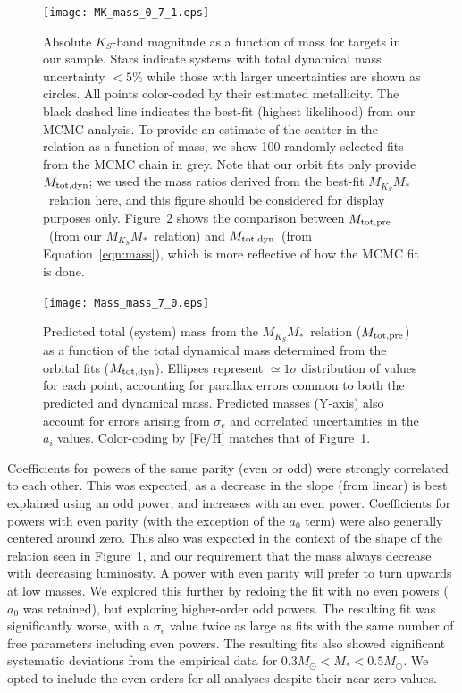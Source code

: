 \documentclass[twocolumn]{aastex62}
\newcommand{\mmk}{$M_{K_S}$\textendash$M_*$}
\newcommand{\mpred}{$M_{\rm{tot,pre}}$}
\newcommand{\mdyn}{$M_{\rm{tot,dyn}}$}
\begin{document}
\begin{figure}[htp]
\begin{center}
\texttt{[image: MK\_mass\_0\_7\_1.eps]}
\caption{Absolute $K_S$-band magnitude as a function of mass for targets in our sample. Stars indicate systems with total dynamical mass uncertainty $<5\%$ while those with larger uncertainties are shown as circles. All points color-coded by their estimated metallicity. The black dashed line indicates the best-fit (highest likelihood) from our MCMC analysis. To provide an estimate of the scatter in the relation as a function of mass, we show 100 randomly selected fits from the MCMC chain in grey. Note that our orbit fits only provide \mdyn; we used the mass ratios derived from the best-fit \mmk\ relation here, and this figure should be considered for display purposes only. Figure~\ref{fig:m_m} shows the comparison between \mpred\ (from our \mmk\ relation) and \mdyn\ (from Equation~\ref{eqn:mass}), which is more reflective of how the MCMC fit is done. }
\label{fig:relation}
\end{center}
\end{figure}

\begin{figure}[ht]
\begin{center}
\texttt{[image: Mass\_mass\_7\_0.eps]}
\caption{Predicted total (system) mass from the \mmk\ relation (\mpred) as a function of the total dynamical mass determined from the orbital fits (\mdyn). Ellipses represent $\simeq1\sigma$ distribution of values for each point, accounting for parallax errors common to both the predicted and dynamical mass. Predicted masses (Y-axis) also account for errors arising from $\sigma_e$ and correlated uncertainties in the $a_i$ values. Color-coding by [Fe/H] matches that of Figure~\ref{fig:relation}.}
\label{fig:m_m}
\end{center}
\end{figure}


Coefficients for powers of the same parity (even or odd) were strongly correlated to each other. This was expected, as a decrease in the slope (from linear) is best explained using an odd power, and increases with an even power. Coefficients for powers with even parity (with the exception of the $a_0$ term) were also generally centered around zero. This also was expected in the context of the shape of the relation seen in Figure~\ref{fig:relation}, and our requirement that the mass always decrease with decreasing luminosity. A power with even parity will prefer to turn upwards at low masses. We explored this further by redoing the fit with no even powers ($a_0$ was retained), but exploring higher-order odd powers. The resulting fit was significantly worse, with a $\sigma_e$ value twice as large as fits with the same number of free parameters including even powers. The resulting fits also showed significant systematic deviations from the empirical data for $0.3M_\odot<M_*<0.5M_\odot$. We opted to include the even orders for all analyses despite their near-zero values. 
\end{document}
